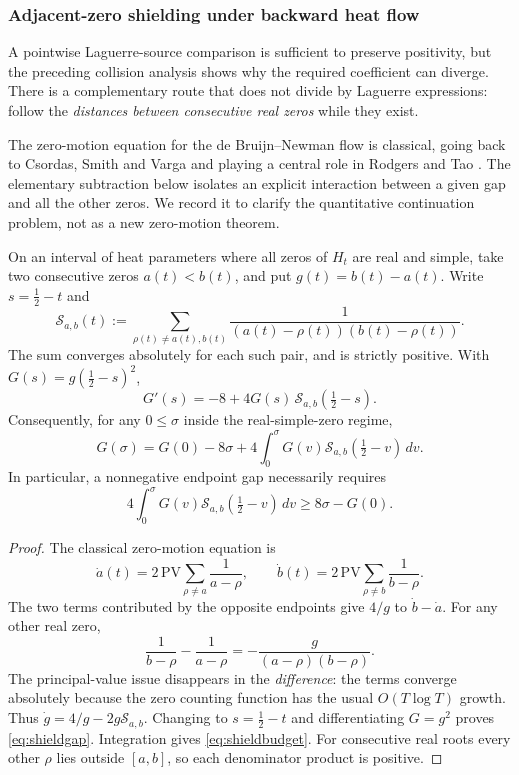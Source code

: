 \subsubsection{Adjacent-zero shielding under backward heat flow}
\label{subsec:zero-shielding}
A pointwise Laguerre-source comparison is sufficient to
preserve positivity, but the preceding collision analysis
shows why the required coefficient can diverge. There is
a complementary route that does not divide by Laguerre
expressions: follow the \emph{distances between consecutive
real zeros} while they exist.

The zero-motion equation for the de Bruijn--Newman flow
is classical, going back to Csordas, Smith and Varga
and playing a central role in Rodgers and Tao
\cite{RodgersTao}. The elementary subtraction below
isolates an explicit interaction between a given gap
and all the other zeros. We record it to clarify
the quantitative continuation problem, not as a
new zero-motion theorem.

\begin{proposition}
\label{prop:gapshield}
On an interval of heat parameters where all zeros of
$H_t$ are real and simple, take two consecutive zeros
$a(t)<b(t)$, and put $g(t)=b(t)-a(t)$. Write
$s=\frac12-t$ and
\[
\mathcal S_{a,b}(t):=
\sum_{\rho(t)\ne a(t),b(t)}
\frac{1}{(a(t)-\rho(t))(b(t)-\rho(t))}.
\]
The sum converges absolutely for each such pair,
and is strictly positive. With $G(s)=g(\frac12-s)^2$,
\begin{equation}
\boxed{G'(s)=-8+4G(s)\,\mathcal S_{a,b}(\tfrac12-s).}
\label{eq:shieldgap}
\end{equation}
Consequently, for any $0\le \sigma$ inside the
real-simple-zero regime,
\begin{equation}
\boxed{
G(\sigma)=G(0)-8\sigma+
4\int_0^\sigma G(v)\mathcal S_{a,b}(\tfrac12-v)\,dv.
}
\label{eq:shieldbudget}
\end{equation}
In particular, a nonnegative endpoint gap necessarily
requires
\[
4\int_0^\sigma G(v)\mathcal S_{a,b}(\tfrac12-v)\,dv
\ge 8\sigma-G(0).
\]
\end{proposition}
\begin{proof}
The classical zero-motion equation is
\[
\dot a(t)=2\,\mathrm{PV}\sum_{\rho\ne a}
\frac1{a-\rho},\qquad
\dot b(t)=2\,\mathrm{PV}\sum_{\rho\ne b}
\frac1{b-\rho}.
\]
The two terms contributed by the opposite endpoints
give $4/g$ to $\dot b-\dot a$. For any other real zero,
\[
\frac1{b-\rho}-\frac1{a-\rho}
=-\frac{g}{(a-\rho)(b-\rho)}.
\]
The principal-value issue disappears in the
\emph{difference}: the terms converge absolutely
because the zero counting function has the usual
$O(T\log T)$ growth. Thus
$\dot g=4/g-2g\mathcal S_{a,b}$.
Changing to $s=\frac12-t$ and differentiating
$G=g^2$ proves \eqref{eq:shieldgap}.
Integration gives \eqref{eq:shieldbudget}.
For consecutive real roots every other $\rho$
lies outside $[a,b]$, so each denominator product
is positive.
\end{proof}

